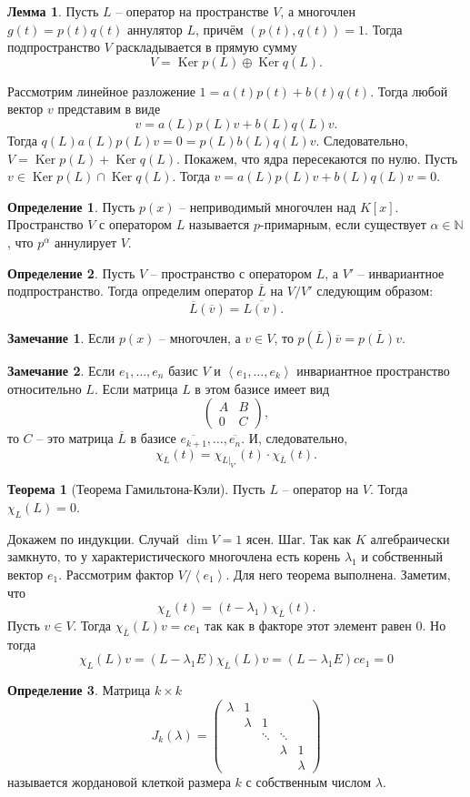 \documentclass[10pt,a4paper,oneside]{book}
\theoremstyle{definition}
\newtheorem*{rem}{Замечание}
\newtheorem*{defn}{Определение}
\newtheorem{thm}{Теорема}
\newtheorem{lem}{Лемма}
\newcommand{\mb}[1]{\mathbb{#1}}
\newcommand{\ovl}{\overline}
\DeclareMathOperator{\Ker}{Ker}
\def\lan{\left\langle }
\def\ran{\right\rangle}
\def\thrm{\begin{thm}}
\def\ethrm{\end{thm}}
\def\dfn{\begin{defn}}
\def\edfn{\end{defn}}
\def\lm{\begin{lem}}
\def\elm{\end{lem}}
\def\rm{\begin{rem}}
\def\erm{\end{rem}}
\def\pmat{\begin{pmatrix}}
\def\epmat{\end{pmatrix}}
\begin{document}
\lm Пусть $L$ -- оператор на пространстве $V$, а  многочлен $g(t)=p(t)q(t)$ аннулятор $L$, причём $(p(t),q(t))=1$. Тогда подпространство $V$ раскладывается в прямую сумму
$$V = \Ker p(L)\oplus \Ker q(L).$$
\elm
\proof Рассмотрим линейное разложение $1=a(t)p(t)+b(t)q(t)$. Тогда любой вектор $v$  представим в виде
$$v=a(L)p(L)v+ b(L)q(L)v.$$
Тогда $q(L)a(L)p(L)v=0=p(L)b(L)q(L)v$. Следовательно, $V= \Ker p(L)+\Ker q(L)$. Покажем, что ядра пересекаются по нулю. Пусть $v\in \Ker p(L) \cap \Ker q(L)$. Тогда $v=a(L)p(L)v+ b(L)q(L)v=0$.
\endproof

\dfn Пусть $p(x)$ -- неприводимый многочлен над $K[x]$. Пространство $V$ с оператором $L$ называется $p$-примарным, если существует $\alpha \in \mb N$, что $p^{\alpha}$ аннулирует $V$.
\edfn

\dfn Пусть $V$ -- пространство с оператором $L$, а $V'$ -- инвариантное подпространство. Тогда определим оператор $\ovl{L}$ на $V/V'$ следующим образом:
$$\ovl{L}(\ovl{v})=\ovl{L(v)}.$$
\edfn

\rm Если $p(x)$ -- многочлен, а $v\in V$, то $p(\ovl{L})\ovl{v}=\ovl{p(L)v}$.
\erm

\rm Если $e_1,\dots,e_n$ базис $V$ и $\lan e_1,\dots,e_k\ran$ инвариантное пространство относительно $L$. Если  матрица $L$ в этом базисе имеет вид $$\pmat A& B \\ 0 & C\epmat,$$
то $C$ -- это матрица $\ovl{L}$ в базисе
$\ovl{e_{k+1}},\dots,\ovl{e_n}$.
И, следовательно, $$\chi_L(t)=\chi_{L|_{V'}}(t)\cdot \chi_{\ovl{L}}(t).$$
\erm

\thrm[Теорема Гамильтона-Кэли] Пусть $L$ -- оператор на $V$. Тогда $\chi_L(L)=0$.
\ethrm
\proof Докажем по индукции. Случай $\dim V=1$ ясен. Шаг. Так как $K$ алгебраически замкнуто, то у характеристического многочлена есть корень $\lambda_1$ и собственный вектор $e_1$. Рассмотрим фактор $V/\lan e_1\ran$. Для него теорема выполнена. Заметим, что $$\chi_L(t)= (t-\lambda_1)\chi_{\ovl{L}}(t).$$
Пусть $v \in V$. Тогда $\chi_{\ovl{L}}(L)v = ce_1$ так как в факторе этот элемент равен 0. Но тогда
$$\chi_L(L)v= (L-\lambda_1 E)\chi_{\ovl{L}}(L)v=(L-\lambda_1 E) ce_1=0$$
\endproof











\dfn
Матрица $k\times k$
$$J_k(\lambda) = \begin{pmatrix}
\lambda& 1&& \\
& \lambda &1& \\
&&\ddots &\ddots& \\
&  && \lambda & 1\\
&  &&& \lambda
\end{pmatrix}
$$
называется жордановой клеткой размера $k$ с собственным числом $\lambda$.
\edfn
\end{document}
